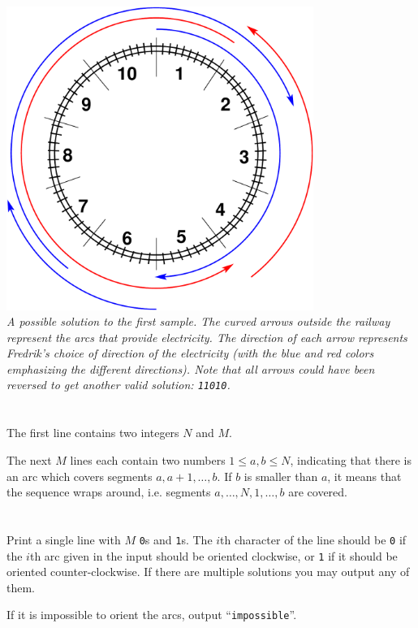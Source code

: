 \includegraphics[width=10cm]{alternatingfig.pdf}\\
{\em A possible solution to the first sample. The curved arrows outside the railway represent the arcs that provide electricity. The direction of each arrow represents Fredrik's choice of direction of the electricity (with the blue and red colors emphasizing the different directions). Note that all arrows could have been reversed to get another valid solution: \texttt{11010}.}

\section*{}
The first line contains two integers $N$ and $M$.

The next $M$ lines each contain two numbers $1 \le a, b \le N$, indicating that
there is an arc which covers segments $a, a+1, \dots, b$. If $b$ is smaller
than $a$, it means that the sequence wraps around, i.e. segments
$a, \dots, N, 1, \dots, b$ are covered.

\section*{\outputsection}
Print a single line with $M$ \texttt{0}s and \texttt{1}s. The $i$th character of the
line should be \texttt{0} if the $i$th arc given in the input should be oriented
clockwise, or \texttt{1} if it should be oriented counter-clockwise.
If there are multiple solutions you may output any of them.

If it is impossible to orient the arcs, output ``\texttt{impossible}''.

